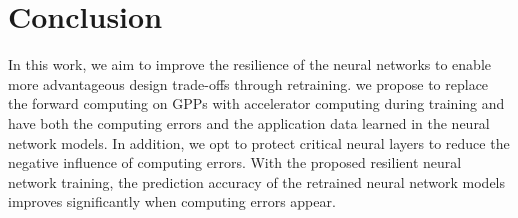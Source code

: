 \section{Conclusion} \label{sec:Conclusion}
In this work, we aim to improve the resilience of the neural networks to enable 
more advantageous design trade-offs through retraining. 
we propose to replace the forward computing on GPPs with accelerator computing during training and have both the computing 
errors and the application data learned in the neural network models. 
In addition, we opt to protect critical neural layers to reduce the negative 
influence of computing errors.  
With the proposed resilient neural network training, 
the prediction accuracy of the retrained neural network models improves significantly 
when computing errors appear. 




